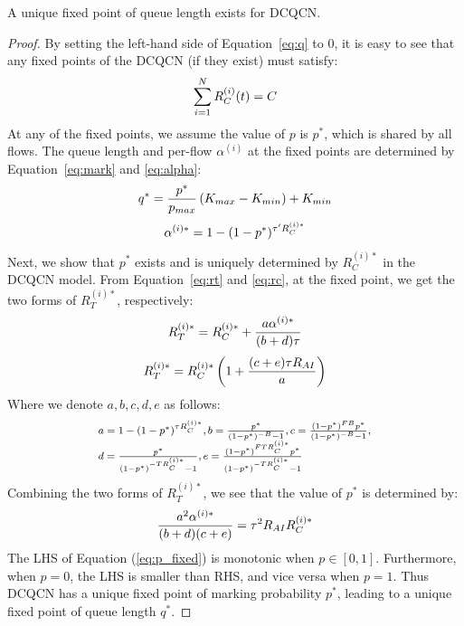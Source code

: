 \begin{thm}
A unique fixed point of queue length exists for DCQCN. 
\end{thm}
\begin{proof}
By setting the left-hand side of Equation~\ref{eq:q} to 0,
it is easy to see that any fixed points of the DCQCN (if they exist) must
satisfy:
\begin{equation}
\small
\sum\limits_{i = 1}^N {R_C^{(i)}(t)} = C
\label{eq:fixedrc}
\end{equation}
At any of the fixed points, we assume the value of $p$ is $p^*$, which is shared
by all flows. The queue length and per-flow $\alpha^{(i)}$ at the fixed points
are determined by Equation~\ref{eq:mark} and \ref{eq:alpha}:
\begin{equation}
\small
{q^*} = \frac{{{p^*}}}{{{p_{max}}}}\left( {{K_{max}} - {K_{min}}} \right) + {K_{min}}
\end{equation}
\begin{equation}
\small
\alpha^{(i)*}  = 1 - {(1 - p^*)^{{\tau '}R_C^{(i)*}}}
\end{equation}
Next, we show that $p^*$ exists and is uniquely determined by $R_C^{(i)*}$ in
the DCQCN model.  From Equation~\ref{eq:rt} and \ref{eq:rc}, at the fixed point,
we get the two forms of $R_T^{(i)*}$, respectively:
\begin{equation}
\small
{R_T^{(i)*}} = R_C^{(i)*} + \frac{{a\alpha^{(i)*} }}{{(b + d)\tau }}
\end{equation}
\begin{equation}
\small
{R_T^{(i)*}} = R_C^{(i)*}\left( {1 + \frac{{(c + e)\tau {R_{AI}}}}{a}} \right)
\end{equation}
Where we denote $a, b, c, d, e$ as follows:
\begin{equation}
\small
\begin{array}{l}
a = 1 - {(1 - p^*)^{\tau {R_C^{(i)*}}}},b = \frac{{p^*}}{{{{(1 - p^*)}^{ - B}} - 1}},c = \frac{{{{(1 - p^*)}^{FB}}p^*}}{{{{(1 - p^*)}^{ - B}} - 1}},\\
d = \frac{{p^*}}{{{{(1 - p^*)}^{ - T{R_C^{(i)*}}}} - 1}},e = \frac{{{{(1 - p^*)}^{FT{R_C^{(i)*}}}}p^*}}{{{{(1 - p^*)}^{ - T{R_C^{(i)*}}}} - 1}}
\end{array}
\end{equation}
Combining the two forms of $R_T^{(i)*}$, we see that the value of $p^*$ is determined by:
\begin{equation}
\small
\frac{{{a^2}\alpha^{(i)*} }}{{(b + d)(c + e)}} = {\tau ^2}{R_{AI}}R_C^{(i)*}
\label{eq:p_fixed}
\end{equation}
The LHS of Equation (\ref{eq:p_fixed}) is monotonic when $p \in [0,1]$.
Furthermore, when $p = 0$, the LHS is smaller than RHS, and vice versa when $p =
1$. Thus DCQCN has a unique fixed point of marking probability $p^*$, leading to
a unique fixed point of queue length $q^*$.
\end{proof}


